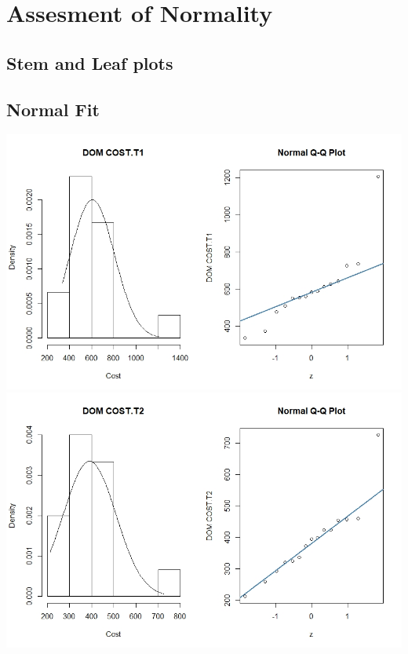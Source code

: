\documentclass[11pt]{article}
\begin{document}
\section{Assesment of Normality}
\subsection{Stem and Leaf plots}

\subsection{Normal Fit}
\includegraphics[width=15cm]{RStudio/jpeg/Norm DOM T1.jpeg}
\includegraphics[width=15cm]{RStudio/jpeg/Norm DOM T2.jpeg}
\end{document}
